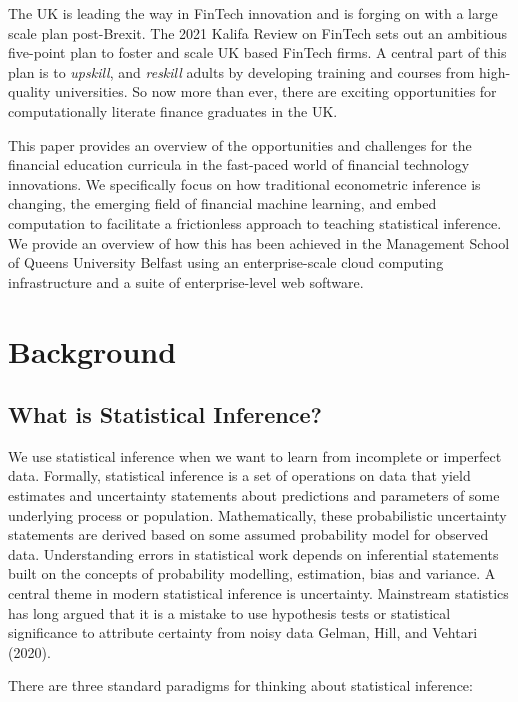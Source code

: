 \documentclass{article}
\begin{document}
The UK is leading the way in FinTech innovation and is forging on with a
large scale plan post-Brexit. The 2021 Kalifa Review on FinTech sets out
an ambitious five-point plan to foster and scale UK based FinTech firms.
A central part of this plan is to \emph{upskill}, and \emph{reskill}
adults by developing training and courses from high-quality
universities. So now more than ever, there are exciting opportunities
for computationally literate finance graduates in the UK.

This paper provides an overview of the opportunities and challenges for
the financial education curricula in the fast-paced world of financial
technology innovations. We specifically focus on how traditional
econometric inference is changing, the emerging field of financial
machine learning, and embed computation to facilitate a frictionless
approach to teaching statistical inference. We provide an overview of
how this has been achieved in the Management School of Queens University
Belfast using an enterprise-scale cloud computing infrastructure and a
suite of enterprise-level web software.

\hypertarget{background}{%
\section{Background}\label{background}}

\hypertarget{what-is-statistical-inference}{%
\subsection{What is Statistical
Inference?}\label{what-is-statistical-inference}}

We use statistical inference when we want to learn from incomplete or
imperfect data. Formally, statistical inference is a set of operations
on data that yield estimates and uncertainty statements about
predictions and parameters of some underlying process or population.
Mathematically, these probabilistic uncertainty statements are derived
based on some assumed probability model for observed data. Understanding
errors in statistical work depends on inferential statements built on
the concepts of probability modelling, estimation, bias and variance. A
central theme in modern statistical inference is uncertainty. Mainstream
statistics has long argued that it is a mistake to use hypothesis tests
or statistical significance to attribute certainty from noisy data
Gelman, Hill, and Vehtari (2020).

There are three standard paradigms for thinking about statistical
inference:
\end{document}
